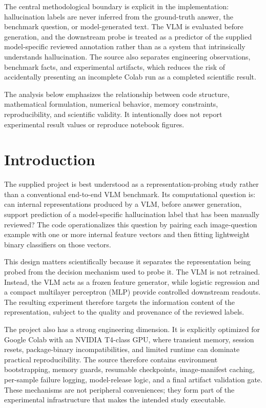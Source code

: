 \documentclass[11pt,a4paper]{article}
\begin{document}
The central methodological boundary is explicit in the implementation: hallucination labels are never inferred from the ground-truth answer, the benchmark question, or model-generated text. The VLM is evaluated before generation, and the downstream probe is treated as a predictor of the supplied model-specific reviewed annotation rather than as a system that intrinsically understands hallucination. The source also separates engineering observations, benchmark facts, and experimental artifacts, which reduces the risk of accidentally presenting an incomplete Colab run as a completed scientific result.

The analysis below emphasizes the relationship between code structure, mathematical formulation, numerical behavior, memory constraints, reproducibility, and scientific validity. It intentionally does not report experimental result values or reproduce notebook figures.

\section{Introduction}

The supplied project is best understood as a representation-probing study rather than a conventional end-to-end VLM benchmark. Its computational question is: can internal representations produced by a VLM, before answer generation, support prediction of a model-specific hallucination label that has been manually reviewed? The code operationalizes this question by pairing each image-question example with one or more internal feature vectors and then fitting lightweight binary classifiers on those vectors.

This design matters scientifically because it separates the representation being probed from the decision mechanism used to probe it. The VLM is not retrained. Instead, the VLM acts as a frozen feature generator, while logistic regression and a compact multilayer perceptron (MLP) provide controlled downstream readouts. The resulting experiment therefore targets the information content of the representation, subject to the quality and provenance of the reviewed labels.

The project also has a strong engineering dimension. It is explicitly optimized for Google Colab with an NVIDIA T4-class GPU, where transient memory, session resets, package-binary incompatibilities, and limited runtime can dominate practical reproducibility. The source therefore contains environment bootstrapping, memory guards, resumable checkpoints, image-manifest caching, per-sample failure logging, model-release logic, and a final artifact validation gate. These mechanisms are not peripheral conveniences; they form part of the experimental infrastructure that makes the intended study executable.
\end{document}
